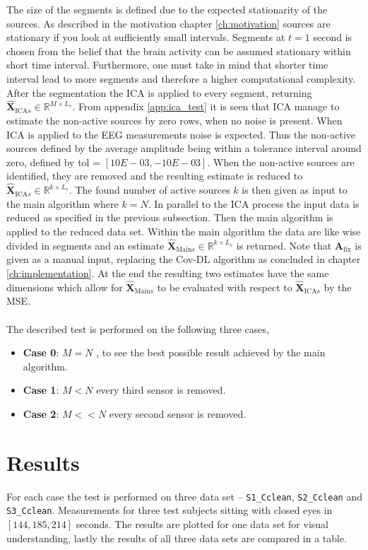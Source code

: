 The size of the segments is defined due to the expected stationarity of the sources. 
As described in the motivation chapter \ref{ch:motivation} sources are stationary if you look at sufficiently small intervals. 
Segments at $t = 1$ second is chosen from the belief that the brain activity can be assumed stationary within short time interval.
Furthermore, one must take in mind that shorter time interval lead to more segments and therefore a higher computational complexity. 
After the segmentation the ICA is applied to every segment, returning $\hat{\textbf{X}}_{\text{ICA} s} \in \mathbb{R}^{M \times L_s}$.
From appendix \ref{app:ica_test} it is seen that ICA manage to estimate the non-active sources by zero rows, when no noise is present. 
When ICA is applied to the EEG measurements noise is expected. 
Thus the non-active sources defined by the average amplitude being within a tolerance interval around zero, defined by tol = $[10E-03, -10E-03]$. 
When the non-active sources are identified, they are removed and the resulting estimate is reduced to $\hat{\textbf{X}}_{\text{ICA} s} \in \mathbb{R}^{k \times L_s}$. 
The found number of active sources $k$ is then given as input to the main algorithm where $k = N$. 
In parallel to the ICA process the input data is reduced as specified in the previous subsection. 
Then the main algorithm is applied to the reduced data set. 
Within the main algorithm the data are like wise divided in segments and an estimate $\hat{\textbf{X}}_{\text{Main} s} \in \mathbb{R}^{k \times L_s}$ is returned. 
Note that $\textbf{A}_{\text{fix}}$ is given as a manual input, replacing the Cov-DL algorithm as concluded in chapter \ref{ch:implementation}.
At the end the resulting two estimates have the same dimensions which allow for $\hat{\textbf{X}}_{\text{Main} s}$ to be evaluated with respect to $\hat{\textbf{X}}_{\text{ICA} s}$ by the MSE. 
\\ \\
The described test is performed on the following three cases,
\begin{itemize}
\item \textbf{Case 0}: $M = N$ , to see the best possible result achieved by the main algorithm. 
\item \textbf{Case 1}: $M < N$ every third sensor is removed. 
\item \textbf{Case 2}: $M << N$ every second sensor is removed.
\end{itemize}

\section{Results}
For each case the test is performed on three data set -- \texttt{S1\_Cclean}, \texttt{S2\_Cclean} and \texttt{S3\_Cclean}. Measurements for three test subjects sitting with closed eyes in $[144, 185, 214]$ seconds.
The results are plotted for one data set for visual understanding, lastly the results of all three data sets are compared in a table.  

